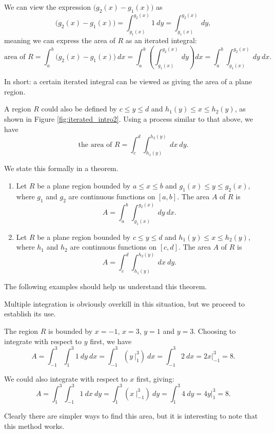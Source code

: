 We can  view the expression $\big(g_2(x)-g_1(x)\big)$ as 
$$\big(g_2(x)-g_1(x)\big) = \int_{g_1(x)}^{g_2(x)} 1\ dy =\int_{g_1(x)}^{g_2(x)} \ dy,$$
meaning we can express the area of $R$ as an iterated integral:
$$\text{area of }R = \int_a^b \big(g_2(x)-g_1(x)\big)\ dx = \int_a^b\left(\int_{g_1(x)}^{g_2(x)} \ dy\right) dx =\int_a^b\int_{g_1(x)}^{g_2(x)} \ dy\ dx.$$

In short: a certain iterated integral can be viewed as giving the area of a plane region.

A region $R$ could also be defined by $c\leq y\leq d$ and $h_1(y)\leq x\leq h_2(y)$, as shown in Figure \ref{fig:iterated_intro2}. Using a process similar to that above, we have 
$$\text{the area of }R = \int_c^d\int_{h_1(y)}^{h_2(y)} \ dx\ dy.$$


We state this formally in a theorem.

{\begin{enumerate}
	\item Let $R$ be a plane region bounded by $a\leq x\leq b$ and $g_1(x)\leq y\leq g_2(x)$, where $g_1$ and $g_2$ are continuous functions on $[a,b]$. The area $A$ of $R$ is
	$$A = \int_a^b\int_{g_1(x)}^{g_2(x)} \ dy\ dx.$$
	\item Let $R$ be a plane region bounded by $c\leq y\leq d$ and $h_1(y)\leq x\leq h_2(y)$, where $h_1$ and $h_2$ are continuous functions on $[c,d]$. The area $A$ of $R$ is
	$$A = \int_c^d\int_{h_1(y)}^{h_2(y)} \ dx\ dy.$$
\end{enumerate}
}

The following examples should help us understand this theorem.\\

{Multiple integration is obviously overkill in this situation, but we proceed to establish its use.

The region $R$ is bounded by $x=-1$, $x=3$, $y=1$ and $y=3$. Choosing to integrate with respect to $y$ first, we have 
$$A = \int_{-1}^3\int_1^3 1\ dy\ dx = \int_{-1}^3 \left(y\ \Big|_1^3\right)\ dx = \int_{-1}^3 2\ dx = 2x\Big|_{-1}^3=8.$$

We could also integrate with respect to $x$ first, giving:
$$A = \int_1^3\int_{-1}^3 1\ dx \ dy =\int_1^3 \left(x\ \Big|_{-1}^3\right)\ dy = \int_1^3 4\ dy = 4y\Big|_1^3 = 8.$$

Clearly there are simpler ways to find this area, but it is interesting to note that this method works.
}\\

